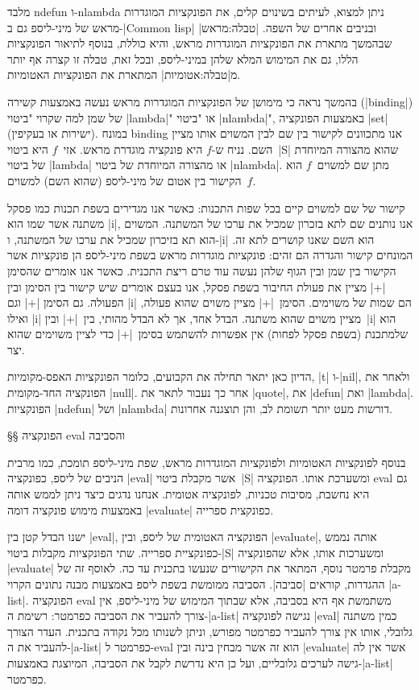 מלבד ndefun ו-nlambda ניתן למצוא, לעיתים בשינוים קלים, את הפונקציות המוגדרות
מראש של מיני-ליספ גם ב-\E|Common lisp| ובניבים אחרים של השפה.
|טבלה:מראש| שבהמשך מתארת את הפונקציות המוגדרות מראש, והיא כוללת, בנוסף
לתיאור הפונקציות הללו, גם את המימוש המלא שלהן במיני-ליספ, ובכל זאת, טבלה זו
קצרה אף יותר מ|טבלה:אטומיות| המתארת את הפונקציות האטומיות.

בהמשך נראה כי מימושן של הפונקציות המוגדרות מראש נעשה באמצעות קשירה
(\E|binding|) של שמן למה שקרוי "ביטוי \E|lambda|" או "ביטוי \E|nlambda|",
באמצעות הפונקציה \E|set| (ישירות או בעקיפין). במונח binding אנו מתכוונים לקישור
בין שם לבין המשוים אותו מציין השם. נניח ש-$f$ היא פונקציה מוגדרת מראש. אזי~$f$
היא ביטוי~\E|S| שהוא מהצורה המיוחדת של ביטוי \E|lambda| או מהצורה המיוחדת של
ביטוי \E|nlambda|. מתן שם למשוים~$f$ הוא הקישור בין אטום של מיני-ליספ (שהוא
השם) למשוים~$f$.

קישור של שם למשוים קיים בכל שפות התכנות: כאשר אנו מגדירים בשפת תכנות כמו פסקל
משתנה אשר שמו הוא \T|i|, אנו נותנים שם לתא בזכרון שמכיל את ערכו של המשתנה.
המשוים הוא תא בזיכרון שמכיל את ערכו של המשתנה, ו-\T|i| הוא השם שאנו קושרים לתא
זה. המונחים קישור והגדרה הם זהים: פונקציות מוגדרות מראש בשפת מיני-ליספ הן
פונקציות אשר הקישור בין שמן ובין הגוף שלהן נעשה עוד טרם ריצת התכנית. כאשר אנו
אומרים שהסימן \T|+| מציין את פעולת החיבור בשפת פסקל, אנו בעצם אומרים שיש קישור
בין הסימן ובין הפעולה. גם הסימן \T|+| וגם \T|i| הם שמות של משוימים. הסימן~\T|+|
מציין משוים שהוא פעולה, ואילו \T|i| מציין משוים שהוא משתנה. הבדל אחד, אך לא
הבדל מהותי, בין~\T|+| ובין~\T|i| הוא שלמתכנת (בשפת פסקל לפחות) אין אפשרות
להשתמש בסימן~\T|+| כדי לציין משוימים שהוא יצר.

הדיון כאן יתאר תחילה את הקבועים, כלומר הפונקציות האפס-מקומיות, \E|t| ו-\E|nil|,
ולאחר את הפונקציה החד-מקומית \E|null|. אחר כך נעבור לתאר את \E|quote|, את
\E|defun| ואת \E|lambda|. הפונקציות \E|ndefun| ושל \E|nlambda| דורשות מעט יותר
תשומת לב, והן תוצגנה אחרונות.

§§ הפונקציה eval והסביבה

בנוסף לפונקציות האטומיות ולפונקציות המוגדרות מראש, שפת מיני-ליספ תומכת, כמו
מרבית הניבים של ליספ, כפונקציה \E|eval| אשר מקבלת ביטוי~\E|S| ומשערכת אותו.
הפונקציה eval גם היא נחשבת, מסיבות טכניות, לפונקציה אטומית. אנחנו נדגים כיצד
ניתן לממש אותה באמצעות מימוש פונקציה דומה \E|evaluate| כפונקצית ספרייה.

ישנו הבדל קטן בין \E|eval|, הפונקציה האטומית של ליספ, ובין \E|evaluate|, אותה
נממש כפונקציית ספרייה. שתי הפונקציות מקבלות ביטוי-\E|S| ומשערכות אותו, אלא
שהפונקציה \E|evaluate| מקבלת פרמטר נוסף, המתאר את הקישורים שנעשו בתכנית עד כה.
לאוסף זה של ההגדרות, קוראים \ע|סביבה|. הסביבה ממומשת בשפת ליספ באמצעות
מבנה נתונים הקרוי \E|a-list|. הפונקציה eval משתמשת אף היא בסביבה, אלא שבתוך
המימוש של מיני-ליספ, אין צורך להעביר את הסביבה כפרמטר: רשימת ה-\E|a-list| נגישה
לפונקציה \E|eval| כמין משתנה גלובלי, אותו אין צורך להעביר כפרמטר מפורש, וניתן
לשנותו מכל נקודה בתכנית. העדר הצורך להעביר את ה-\E|a-list| כפרמטר ל-eval הוא זה
אשר מבחין בינה ובין \E|evaluate| אשר אין לה גישה לערכים גלובליים, ועל כן היא
נדרשת לקבל את הסביבה, המיוצגת באמצעות-\E|a-list| כפרמטר.

